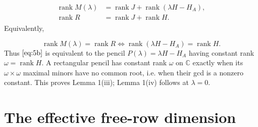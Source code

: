 \documentclass[journal]{IEEEtran}
\theoremstyle{plainn}
\begin{document}
\begin{equation}
\begin{gathered}
\begin{aligned}
\operatorname{rank}M(\lambda)&=\operatorname{rank}J+\operatorname{rank}(\lambda H-H_A),\\
\operatorname{rank}R&=\operatorname{rank}J+\operatorname{rank}H.
\end{aligned}
\end{gathered}
\end{equation}
Equivalently,

\begin{equation}
\operatorname{rank}M(\lambda)=\operatorname{rank}R
\iff
\operatorname{rank}(\lambda H-H_A)=\operatorname{rank}H.
\end{equation}
Thus $\eqref{eq:5b}$ is equivalent to the pencil $P(\lambda)=\lambda H-H_A$ having constant rank $\omega=\operatorname{rank}H$. A rectangular pencil has constant rank $\omega$ on $\mathbb C$ exactly when its $\omega\times\omega$ maximal minors have no common root, i.e. when their gcd is a nonzero constant. This proves Lemma 1(iii); Lemma 1(iv) follows at $\lambda=0$.

\section{The effective free-row dimension}\label{sec:dimension}
\end{document}
